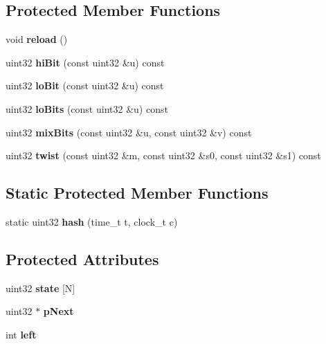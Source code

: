 \subsection*{Protected Member Functions}
\begin{DoxyCompactItemize}
\item 
\mbox{\label{classMTRand_a1d5fcb69d83f4d2fd653883c8352f86c}} 
void {\bfseries reload} ()
\item 
\mbox{\label{classMTRand_a900c4700226add7e7eb0c2efd9f24ced}} 
uint32 {\bfseries hi\+Bit} (const uint32 \&u) const
\item 
\mbox{\label{classMTRand_a6e2f7d8bae68dc63f6bcbb954cf4fb29}} 
uint32 {\bfseries lo\+Bit} (const uint32 \&u) const
\item 
\mbox{\label{classMTRand_a1930fa7c242d35be28bb99b18a84a93d}} 
uint32 {\bfseries lo\+Bits} (const uint32 \&u) const
\item 
\mbox{\label{classMTRand_a41b6713f75a771c5ec8e71ef6832a5fa}} 
uint32 {\bfseries mix\+Bits} (const uint32 \&u, const uint32 \&v) const
\item 
\mbox{\label{classMTRand_adf604988eb6155df3143d9207f02f61a}} 
uint32 {\bfseries twist} (const uint32 \&m, const uint32 \&s0, const uint32 \&s1) const
\end{DoxyCompactItemize}
\subsection*{Static Protected Member Functions}
\begin{DoxyCompactItemize}
\item 
\mbox{\label{classMTRand_a486885d03f38c844315d002e6312fa23}} 
static uint32 {\bfseries hash} (time\+\_\+t t, clock\+\_\+t c)
\end{DoxyCompactItemize}
\subsection*{Protected Attributes}
\begin{DoxyCompactItemize}
\item 
\mbox{\label{classMTRand_a2c87f537429bf0b0f6a452c22b9eebba}} 
uint32 {\bfseries state} \mbox{[}N\mbox{]}
\item 
\mbox{\label{classMTRand_a2b80858137c88fe69d4d2bdc665bcf93}} 
uint32 $\ast$ {\bfseries p\+Next}
\item 
\mbox{\label{classMTRand_a98eabf568c88f121e44f487397f32495}} 
int {\bfseries left}
\end{DoxyCompactItemize}
